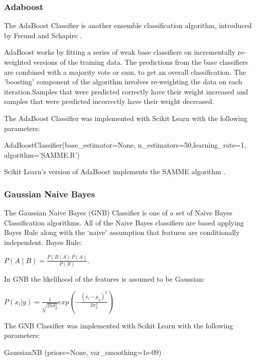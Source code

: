 \subsubsection*{Adaboost}

The AdaBoost Classifier is another ensemble classification algorithm, introduced by Freund and Schapire \cite{adaboost1997}.

AdaBoost works by fitting a series of weak base classifiers on incrementally re-weighted versions of the training data. The predictions from the base classifiers are combined with a majority vote or sum, to get an overall classification. The 'boosting' component of the algorithm involves re-weighting the data on each iteration.Samples that were predicted correctly have their weight increased and samples that were predicted incorrectly have their weight decreased.

The AdaBoost Classifier was implemented with Scikit Learn with the following parameters:

\begin{tcolorbox}
\begin{center}
	AdaBoostClassifier(base\_estimator=None, n\_estimators=50,learning\_rate=1, algorithm=’SAMME.R’)
\end{center}
\end{tcolorbox}

Scikit Learn's version of AdaBoost implements the SAMME algorithm \cite{multiclassada2009}.

\subsubsection*{Gaussian Naive Bayes}

The Gaussian Naive Bayes (GNB) Classifier is one of a set of Naive Bayes Classification algorithms. All of the Naive Bayes classifiers are based applying Bayes Rule along with the ‘naive’ assumption that features are conditionally independent. Bayes Rule: 
\begin{center}
\(P(A\mid B)=\frac{P(B\mid A)\:P(A)}{P(B)}\). 
\end{center}
In GNB the likelihood of the features is assumed to be Gaussian:
\begin{center}
$P(x_i|y) = \frac{1}{\sqrt{2\pi\sigma_y^2}} exp (- \frac{(x_i - \mu_y)^2}{2\sigma_y^2})$
\end{center}
The GNB Classifier was implemented with Scikit Learn with the following parameters:

\begin{tcolorbox}
\begin{center}
	GaussianNB (priors=None, var\_smoothing=1e-09)
\end{center}
\end{tcolorbox}

